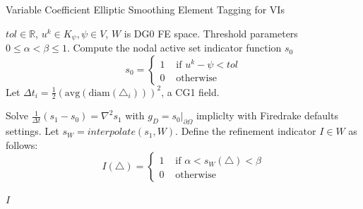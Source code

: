 \documentclass[12 pt]{report}
\begin{document}
\begin{algorithm}[H]
	\caption{Variable Coefficient Elliptic Smoothing Element Tagging for VIs}\label{alg:cap}
	\begin{algorithmic}[1]
		\Require $tol \in \mathbb{R}$, $u^k \in K_\psi, \psi \in V$, $W$ is DG0 FE space.
		\Require Threshold parameters $0\leq \alpha < \beta \leq 1$.
		\State Compute the nodal active set indicator function $s_0$
		  \begin{equation*}
			s_0 = \begin{cases}
			  1 & \text{ if } u^k - \psi < tol\\
			  0 & \text{ otherwise}
			\end{cases}
		  \end{equation*}
		\State Let $\Delta t_i = \frac{1}{2}(\text{avg}(\text{diam}(\triangle_i)))^2$, a CG1 field.
	  
		\State Solve $\frac{1}{\Delta t}(s_1 - s_0) = \nabla^2 s_1$ with $g_D = s_0|_{\partial\Omega}$ impliclty with Firedrake defaults settings. 
		\State Let $s_W = interpolate(s_1, W)$.
		\State Define the refinement indicator $I \in W$ as follows:
		\begin{equation*}
		  I(\triangle) = \begin{cases}
			1 & \text{ if } \alpha < s_W(\triangle) < \beta\\
			0 & \text{ otherwise}
		  \end{cases}
		\end{equation*}\\
		\Return $I$
	\end{algorithmic}
	\end{algorithm}
\end{document}
